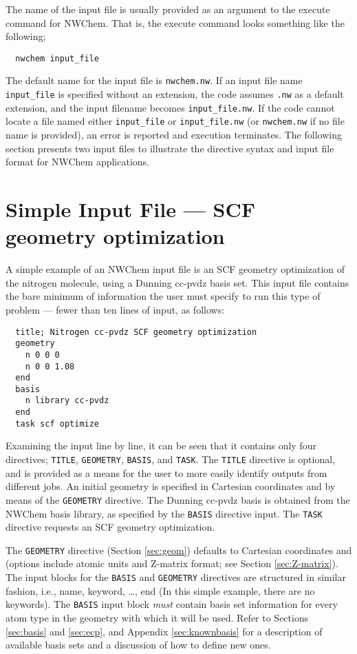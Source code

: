 The name of the input file is usually provided as an argument to the
execute command for NWChem.  That is, the execute command looks
something like the following;

\begin{verbatim}
  nwchem input_file
\end{verbatim}

The default name for the input file is \verb+nwchem.nw+.  If an input
file name \verb+input_file+ is specified without an extension, the
code assumes \verb+.nw+ as a default extension, and the input filename
becomes \verb+input_file.nw+.  If the code cannot locate a file named
either \verb+input_file+ or \verb+input_file.nw+ (or \verb+nwchem.nw+
if no file name is provided), an error is reported and execution
terminates.  The following section presents two input files to
illustrate the directive syntax and input file format for NWChem
applications.

\section{Simple Input File --- SCF geometry optimization}
\label{sec:simplesample}

A simple example of an NWChem input file is an SCF geometry optimization of
the nitrogen molecule, using a Dunning cc-pvdz basis set.  This input
file contains the bare minimum of information the user must specify
to run this type of problem --- fewer than ten lines of input,
as follows:
\begin{verbatim}
  title; Nitrogen cc-pvdz SCF geometry optimization
  geometry  
    n 0 0 0
    n 0 0 1.08
  end
  basis
    n library cc-pvdz
  end
  task scf optimize
\end{verbatim}

Examining the input line by line, it can be seen that it contains
only four directives; \verb+TITLE+, \verb+GEOMETRY+, \verb+BASIS+, and
\verb+TASK+.  The \verb+TITLE+ directive is optional, and is provided
as a means for the user to more easily identify outputs from different
jobs.  An initial geometry is specified in Cartesian coordinates and
{\angstroms} by means of the \verb+GEOMETRY+ directive.  The Dunning 
cc-pvdz basis is obtained from the NWChem basis library, as specified
by the \verb+BASIS+ directive input.  The \verb+TASK+ directive requests 
an SCF geometry optimization.

The \verb+GEOMETRY+ directive (Section \ref{sec:geom}) defaults to Cartesian
coordinates and {\angstroms} (options include atomic units and
Z-matrix format; see Section \ref{sec:Z-matrix}).  The input blocks for the  \verb+BASIS+ 
and \verb+GEOMETRY+ directives are structured in similar fashion, 
i.e., name, keyword, \ldots, end (In this simple example, there are no keywords).  The \verb+BASIS+ input block {\em must} contain basis set information for
every atom type in the geometry with which it will be used.
Refer to Sections \ref{sec:basis} and \ref{sec:ecp}, and Appendix
\ref{sec:knownbasis} for a description of available basis sets and a
discussion of how to define new ones.

